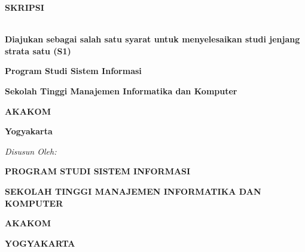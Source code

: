 {}
%
\begin{center}
{\Large \textbf{SKRIPSI}\\[1cm] }
{\Large 
	\textbf{\judulindo}\\[0.3cm]
	\textbf{\textit{\judulinggris}}
}

\vspace{4\baselineskip}

\textbf{Diajukan sebagai salah satu syarat untuk menyelesaikan studi jenjang strata satu (S1)}

\textbf{Program Studi Sistem Informasi}

\textbf{Sekolah Tinggi Manajemen Informatika dan Komputer}

\textbf{AKAKOM}

\textbf{Yogyakarta}

\vspace{3\baselineskip}

\textit{Disusun Oleh:}

\textbf{\nama}

\textbf{\nim}

\vspace{8\baselineskip}
{\textbf{PROGRAM STUDI SISTEM INFORMASI}
	
	\textbf{SEKOLAH TINGGI MANAJEMEN INFORMATIKA DAN KOMPUTER}
	
	\textbf{AKAKOM}
	
	\textbf{YOGYAKARTA}
	
	\the\year{}
}

\end{center}
